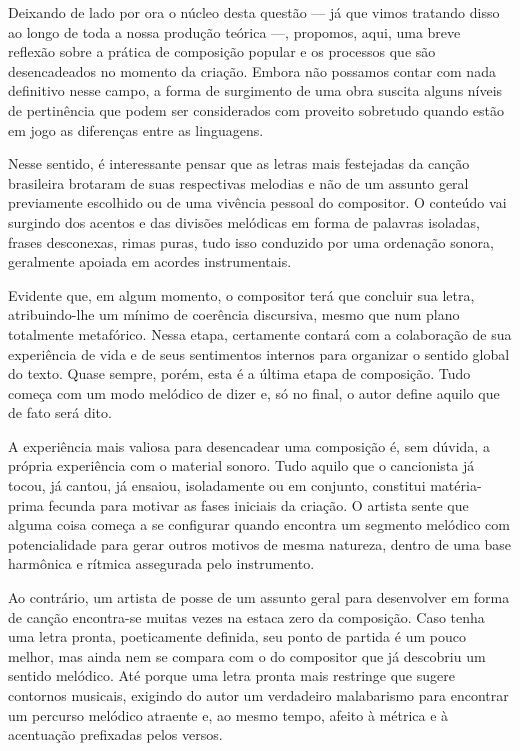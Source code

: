 Deixando de lado por ora o núcleo desta questão --- já que vimos tratando
disso ao longo de toda a nossa produção teórica ---, propomos, aqui, uma
breve reflexão sobre a prática de composição popular e os processos que
são desencadeados no momento da criação. Embora não possamos contar com
nada definitivo nesse campo, a forma de surgimento de uma obra suscita
alguns níveis de pertinência que podem ser considerados com proveito
sobretudo quando estão em jogo as diferenças entre as linguagens.

Nesse sentido, é interessante pensar que as letras mais festejadas da
canção brasileira brotaram de suas respectivas melodias e não de um
assunto geral previamente escolhido ou de uma vivência pessoal do
compositor. O conteúdo vai surgindo dos acentos e das divisões melódicas
em forma de palavras isoladas, frases desconexas, rimas puras, tudo isso
conduzido por uma ordenação sonora, geralmente apoiada em acordes
instrumentais.

Evidente que, em algum momento, o compositor terá que concluir sua
letra, atribuindo-lhe um mínimo de coerência discursiva, mesmo que num
plano totalmente metafórico. Nessa etapa, certamente contará com a
colaboração de sua experiência de vida e de seus sentimentos internos
para organizar o sentido global do texto. Quase sempre, porém, esta é a
última etapa de composição. Tudo começa com um modo melódico de dizer e,
só no final, o autor define aquilo que de fato será dito.

A experiência mais valiosa para desencadear uma composição é, sem
dúvida, a própria experiência com o material sonoro. Tudo aquilo que o
cancionista já tocou, já cantou, já ensaiou, isoladamente ou em
conjunto, constitui matéria-prima fecunda para motivar as fases iniciais
da criação. O artista sente que alguma coisa começa a se configurar
quando encontra um segmento melódico com potencialidade para gerar
outros motivos de mesma natureza, dentro de uma base harmônica e rítmica
assegurada pelo instrumento.

Ao contrário, um artista de posse de um assunto geral para desenvolver
em forma de canção encontra-se muitas vezes na estaca zero da
composição. Caso tenha uma letra pronta, poeticamente definida, seu
ponto de partida é um pouco melhor, mas ainda nem se compara com o do
compositor que já descobriu um sentido melódico. Até porque uma letra
pronta mais restringe que sugere contornos musicais, exigindo do autor
um verdadeiro malabarismo para encontrar um percurso melódico atraente
e, ao mesmo tempo, afeito à métrica e à acentuação prefixadas pelos
versos.

